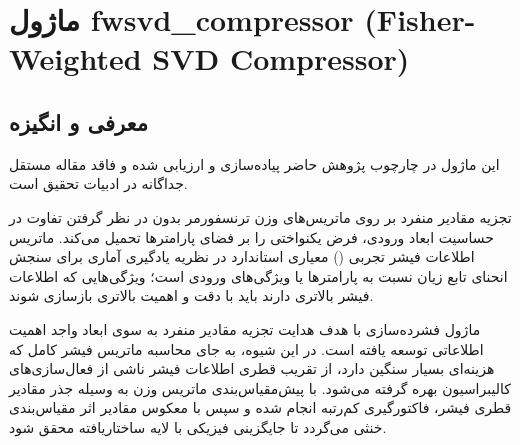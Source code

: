 \section{ماژول fwsvd\_compressor (Fisher-Weighted SVD Compressor)}
\label{sec:module_fwsvd_compressor}

\subsection{معرفی و انگیزه}
این ماژول در چارچوب پژوهش حاضر پیاده‌سازی و ارزیابی شده و فاقد مقاله مستقل جداگانه در ادبیات تحقیق است.

تجزیه مقادیر منفرد بر روی ماتریس‌های وزن ترنسفورمر بدون در نظر گرفتن تفاوت در حساسیت ابعاد ورودی، فرض یکنواختی را بر فضای پارامترها تحمیل می‌کند. ماتریس اطلاعات فیشر تجربی () معیاری استاندارد در نظریه یادگیری آماری برای سنجش انحنای تابع زیان نسبت به پارامترها یا ویژگی‌های ورودی است؛ ویژگی‌هایی که اطلاعات فیشر بالاتری دارند باید با دقت و اهمیت بالاتری بازسازی شوند.

ماژول فشرده‌سازی  با هدف هدایت تجزیه مقادیر منفرد به سوی ابعاد واجد اهمیت اطلاعاتی توسعه یافته است. در این شیوه، به جای محاسبه ماتریس فیشر کامل که هزینه‌ای بسیار سنگین دارد، از تقریب قطری اطلاعات فیشر ناشی از فعال‌سازی‌های کالیبراسیون بهره گرفته می‌شود. با پیش‌مقیاس‌بندی ماتریس وزن به وسیله جذر مقادیر قطری فیشر، فاکتورگیری کم‌رتبه انجام شده و سپس با معکوس مقادیر اثر مقیاس‌بندی خنثی می‌گردد تا جایگزینی فیزیکی با لایه ساختاریافته  محقق شود.

